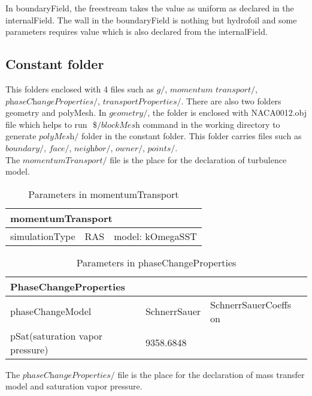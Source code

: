 


In boundaryField, the freestream takes the value as uniform as declared in the internalField. The wall in the boundaryField is nothing but hydrofoil and some parameters requires 
value which is also declared from the internalField.

\subsection{Constant folder}
This folders enclosed with 4 files such as $\textit{g}/$, $\textit{momentum transport}/$, $\textit{phaseChangeProperties}/$, $\textit{transportProperties}/$. There are also two folders geometry 
and polyMesh. In $\textit{geometry}/$, the folder is enclosed with NACA0012.obj file which helps to run $\textit{ \$/blockMesh}$ command in the working directory to generate $\textit{polyMesh}/$ folder in the constant folder. This
folder carries files such as $\textit{boundary}/$, $\textit{face}/$, $\textit{neighbor}/$, $\textit{owner}/$, $\textit{points}/$.\\
The $\textit{momentumTransport/}$ file is the place for the declaration of turbulence model.
\begin{table}[h]
\centering
\begin{tabular}{|lll|}
\hline
\multicolumn{3}{|l|}{momentumTransport}                            \\ \hline
\multicolumn{1}{|l|}{simulationType } & \multicolumn{1}{l|}{RAS} & model:          kOmegaSST \\ \hline
\end{tabular}
\caption{Parameters in momentumTransport}
\label{tab:PC}
\end{table}
\begin{table}[h]
\centering
\begin{tabular}{|lll|}
\hline
\multicolumn{3}{|l|}{PhaseChangeProperties}                            \\ \hline
\multicolumn{1}{|l|}{phaseChangeModel} & \multicolumn{1}{l|}{SchnerrSauer} & SchnerrSauerCoeffs on \\ \hline
\multicolumn{1}{|l|}{pSat(saturation vapor pressure)} & \multicolumn{2}{l|}{9358.6848}    \\ \hline
\end{tabular}
\caption{Parameters in phaseChangeProperties}
\label{tab:PC}
\end{table}
The $\textit{phaseChangeProperties/}$ file is the place for the declaration of mass transfer model and saturation vapor pressure.
